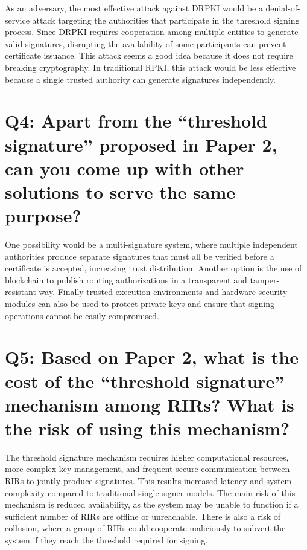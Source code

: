 \documentclass{article}
\begin{document}
As an adversary, the most effective attack against DRPKI would be a denial-of-service attack targeting the authorities that participate in the threshold signing process. Since DRPKI requires cooperation among multiple entities to generate valid signatures, disrupting the availability of some participants can prevent certificate issuance. This attack seems a good idea because it does not require breaking cryptography. In traditional RPKI, this attack would be less effective because a single trusted authority can generate signatures independently.

\section*{
Q4: Apart from the “threshold signature” proposed in Paper 2, can you come up with other solutions to serve the same purpose?
}

One possibility would be a multi-signature system, where multiple independent authorities produce separate signatures that must all be verified before a certificate is accepted, increasing trust distribution. Another option is the use of blockchain to publish routing authorizations in a transparent and tamper-resistant way. Finally trusted execution environments and hardware security modules can also be used to protect private keys and ensure that signing operations cannot be easily compromised.

\section*{
Q5: Based on Paper 2, what is the cost of the “threshold signature” mechanism among RIRs? What is the risk of using this mechanism?
} 

The threshold signature mechanism requires higher computational resources, more complex key management, and frequent secure communication between RIRs to jointly produce signatures. This results increased latency and system complexity compared to traditional single-signer models. The main risk of this mechanism is reduced availability, as the system may be unable to function if a sufficient number of RIRs are offline or unreachable. There is also a risk of collusion, where a group of RIRs could cooperate maliciously to subvert the system if they reach the threshold required for signing.
\end{document}
